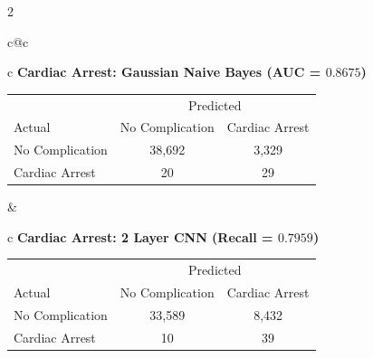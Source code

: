 \documentclass[bst/sn-nature]{sn-jnl}
\begin{document}
\begin{multicols}{2}
\begin{table}[htbp]
\centering
\scriptsize
\setlength{\tabcolsep}{4pt}
\renewcommand{\arraystretch}{1.2}
\begin{tabular}{c@{\hspace{0.3cm}}c}
\begin{tabular}{c}
\textbf{Cardiac Arrest: Gaussian Naive Bayes (AUC = $0.8675$)} \\
\begin{tabular}{|l|c|c|}
\hline
 & \multicolumn{2}{c|}{Predicted} \\
Actual & No Complication & Cardiac Arrest \\
\hline
No Complication & \cellcolor[gray]{0.9}38,692 & \cellcolor[gray]{0.9}3,329 \\
Cardiac Arrest & \cellcolor[gray]{0.9} 20 & \cellcolor[gray]{0.9} 29 \\
\hline
\end{tabular}
\end{tabular}
&
\begin{tabular}{c}
\textbf{Cardiac Arrest: 2 Layer CNN (Recall = $0.7959$)} \\
\begin{tabular}{|l|c|c|}
\hline
 & \multicolumn{2}{c|}{Predicted} \\
Actual & No Complication & Cardiac Arrest \\
\hline
No Complication & \cellcolor[gray]{0.9}33,589 & \cellcolor[gray]{0.9}8,432 \\
Cardiac Arrest & \cellcolor[gray]{0.9} 10 & \cellcolor[gray]{0.9} 39 \\
\hline
\end{tabular}
\end{tabular}
\vspace{1.2cm}
\\[1.5ex]
\end{tabular}
\end{table}
\end{multicols}
\end{document}
